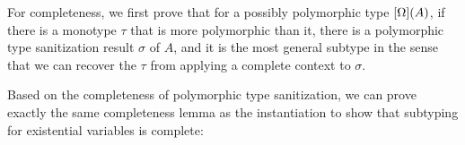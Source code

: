 For completeness, we first prove that for a possibly polymorphic type $[\Omega](A)$, if there is a monotype $\tau$ that is more polymorphic than it, there
is a polymorphic type sanitization result $\sigma$ of $A$, and it is the most
general subtype in the sense that we can recover the $\tau$ from applying a
complete context to $\sigma$.

\begin{lemma}[\PolymorphicTypeSanitizationCompletenessName]
  \label{lemma:\PolymorphicTypeSanitizationCompletenessName}
  \PolymorphicTypeSanitizationCompletenessBody
\end{lemma}

Based on the completeness of polymorphic type sanitization, we can prove exactly
the same completeness lemma as the instantiation to show that subtyping for
existential variables is complete:

\begin{corollary}[\PolymorphicTypeSanitizationCompletenessSubtypingName]
  \label{lemma:\PolymorphicTypeSanitizationCompletenessSubtypingName}
  \PolymorphicTypeSanitizationCompletenessSubtypingBody
\end{corollary}

